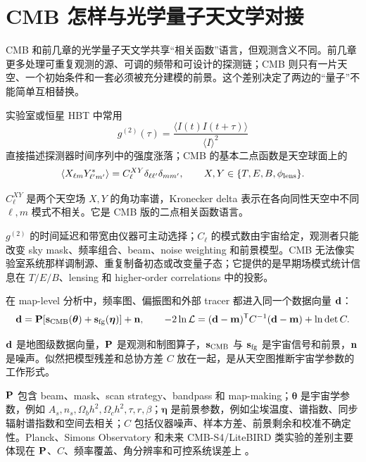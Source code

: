 \section{CMB 怎样与光学量子天文学对接}

CMB 和前几章的光学量子天文学共享“相关函数”语言，但观测含义不同。前几章更多处理可重复观测的源、可调的频带和可设计的探测链；CMB 则只有一片天空、一个初始条件和一套必须被充分建模的前景。这个差别决定了两边的“量子”不能简单互相替换。

实验室或恒星 HBT 中常用
\[
  g^{(2)}(\tau)
  =
  \frac{\langle I(t)I(t+\tau)\rangle}{\langle I\rangle^2}
\]
直接描述探测器时间序列中的强度涨落；CMB 的基本二点函数是天空球面上的
\begin{equation}
  \langle
  X_{\ell m}Y_{\ell' m'}^*
  \rangle
  =
  C_\ell^{XY}\delta_{\ell\ell'}\delta_{mm'},
  \qquad
  X,Y\in\{T,E,B,\phi_{\rm lens}\}.
  \label{eq:ch16-cmb-correlator}
\end{equation}
\begin{formulaexplain}[公式 (16.16) 解读]
\(C_\ell^{XY}\) 是两个天空场 \(X,Y\) 的角功率谱，Kronecker delta 表示在各向同性天空中不同 \(\ell,m\) 模式不相关。它是 CMB 版的二点相关函数语言。
\end{formulaexplain}
\(g^{(2)}\) 的时间延迟和带宽由仪器可主动选择；\(C_\ell\) 的模式数由宇宙给定，观测者只能改变 sky mask、频率组合、beam、noise weighting 和前景模型。CMB 无法像实验室系统那样调制源、重复制备初态或改变量子态；它提供的是早期场模式统计信息在 \(T/E/B\)、lensing 和 higher-order correlations 中的投影。

在 map-level 分析中，频率图、偏振图和外部 tracer 都进入同一个数据向量 \({\bf d}\)：
\begin{equation}
  {\bf d}
  =
  {\bf P}
  [
    {\bf s}_{\rm CMB}({\boldsymbol\theta})
    +
    {\bf s}_{\rm fg}({\boldsymbol\eta})
  ]
  +
  {\bf n},
  \qquad
  -2\ln\mathcal L
  =
  ({\bf d}-{\bf m})^{\mathsf T}
  C^{-1}
  ({\bf d}-{\bf m})
  +
  \ln\det C .
  \label{eq:ch16-cmb-likelihood}
\end{equation}
\begin{formulaexplain}[公式 (16.17) 解读]
\({\bf d}\) 是地图级数据向量，\({\bf P}\) 是观测和制图算子，\({\bf s}_{\rm CMB}\) 与 \({\bf s}_{\rm fg}\) 是宇宙信号和前景，\({\bf n}\) 是噪声。似然把模型残差和总协方差 \(C\) 放在一起，是从天空图推断宇宙学参数的工作形式。
\end{formulaexplain}
\({\bf P}\) 包含 beam、mask、scan strategy、bandpass 和 map-making；\({\boldsymbol\theta}\) 是宇宙学参数，例如 \(A_s,n_s,\Omega_bh^2,\Omega_ch^2,\tau,r,\beta\)；\({\boldsymbol\eta}\) 是前景参数，例如尘埃温度、谱指数、同步辐射谱指数和空间去相关；\(C\) 包括仪器噪声、样本方差、前景剩余和校准不确定性。Planck、Simons Observatory 和未来 CMB-S4/LiteBIRD 类实验的差别主要体现在 \({\bf P}\)、\(C\)、频率覆盖、角分辨率和可控系统误差上 \citep{2016A&A...594A..13P,2016A&A...594A..20P,2017MNRAS.472.1195C,2019JCAP...02..056A,2020A&A...641A...6P}。

